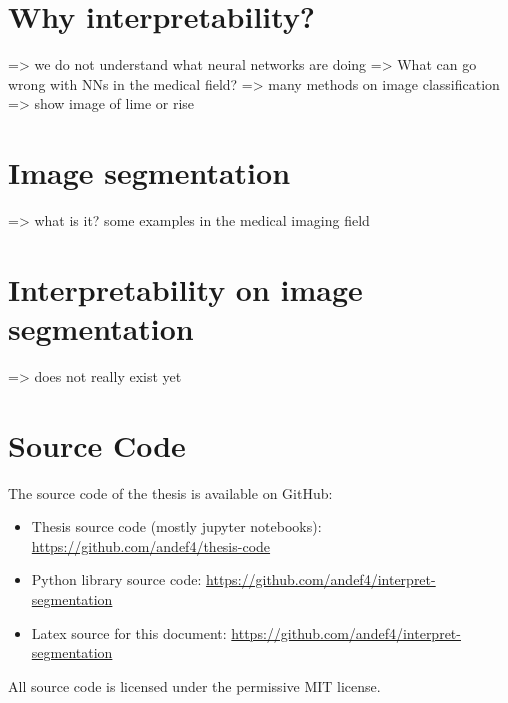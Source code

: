 \section{Why interpretability?}
=> we do not understand what neural networks are doing
=> What can go wrong with NNs in the medical field?
=> many methods on image classification => show image of lime or rise

\section{Image segmentation}
=> what is it? some examples in the medical imaging field

\section{Interpretability on image segmentation}
=> does not really exist yet

\section{Source Code}
The source code of the thesis is available on GitHub:
\begin{itemize}
    \item Thesis source code (mostly jupyter notebooks): \url{https://github.com/andef4/thesis-code}
    \item Python library source code: \url{https://github.com/andef4/interpret-segmentation}
    \item Latex source for this document: \url{https://github.com/andef4/interpret-segmentation}
\end{itemize}

All source code is licensed under the permissive MIT license.